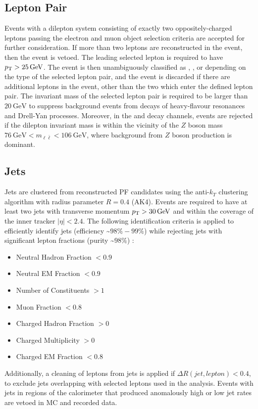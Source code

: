 \subsection{Lepton Pair}
Events with a dilepton system consisting of exactly two oppositely-charged leptons passing the electron and muon object selection criteria are accepted for further consideration.
If more than two leptons are reconstructed in the event, then the event is vetoed.
The leading selected lepton is required to have $\pT > \SI{25}{\GeV}$.
The event is then unambiguously classified as \ee, \emu, or \mumu depending on the type of the selected lepton pair, and the event is discarded if there are additional leptons in the event, other than the two which enter the defined lepton pair.
The invariant mass of the selected lepton pair is required to be larger than $\SI{20}{\GeV}$ to suppress background events from decays of heavy-flavour resonances and Drell-Yan processes.
Moreover, in the \mumu and \ee decay channels, events are rejected if the dilepton invariant mass is within the vicinity of the $Z$ boson mass $\SI{76}{\GeV} < m_{\ell\bar{\ell}} < \SI{106}{\GeV}$, where background from $Z$ boson production is dominant.

\subsection{Jets}
Jets are clustered from reconstructed PF candidates using the anti-$k_T$ clustering algorithm with radius parameter $R = 0.4$ (AK4).
Events are required to have at least two jets with transverse momentum $\pT > \SI{30}{\GeV}$ and within the coverage of the inner tracker $\vert \eta \vert < 2.4$. 
The following identification criteria is applied to efficiently identify jets (efficiency \sim $98\% - 99\%$) while rejecting jets with significant lepton fractions (purity \sim $98\%$) :
\begin{itemize}
\item Neutral Hadron Fraction $<0.9$
\item Neutral EM Fraction $<0.9$
\item Number of Constituents $>1$
\item Muon Fraction $<0.8$
\item Charged Hadron Fraction $>0$
\item Charged Multiplicity $> 0$
\item Charged EM Fraction $<0.8$ 
\end{itemize}
Additionally, a cleaning of leptons from jets is applied if $\Delta R(jet,lepton)<0.4$, to exclude jets overlapping with selected leptons used in the analysis.
Events with jets in regions of the calorimeter that produced anomalously high or low jet rates are vetoed in MC and recorded data.

